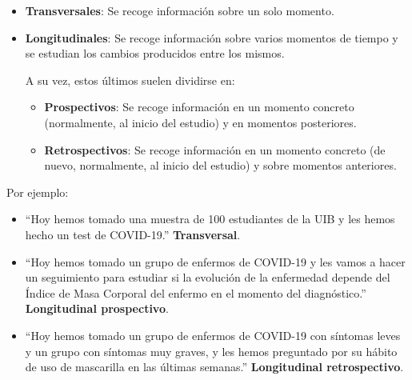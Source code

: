 \documentclass[
]{book}
\providecommand{\tightlist}{%
  \setlength{\itemsep}{0pt}\setlength{\parskip}{0pt}}
\theoremstyle{definition}
\theoremstyle{definition}
\theoremstyle{definition}
\theoremstyle{definition}
\theoremstyle{remark}
\begin{document}
\begin{itemize}
  \begin{itemize}
  \item
    \textbf{Transversales}: Se recoge información sobre un solo momento.
  \item
    \textbf{Longitudinales}: Se recoge información sobre varios momentos de tiempo y se estudian los cambios producidos entre los mismos.

    A su vez, estos últimos suelen dividirse en:

    \begin{itemize}
    \item
      \textbf{Prospectivos}: Se recoge información en un momento concreto (normalmente, al inicio del estudio) y en momentos posteriores.
    \item
      \textbf{Retrospectivos}: Se recoge información en un momento concreto (de nuevo, normalmente, al inicio del estudio) y sobre momentos anteriores.
    \end{itemize}
  \end{itemize}

  Por ejemplo:

  \begin{itemize}
  \tightlist
  \item
    ``Hoy hemos tomado una muestra de 100 estudiantes de la UIB y les hemos hecho un test de COVID-19.'' \textbf{Transversal}.
  \item
    ``Hoy hemos tomado un grupo de enfermos de COVID-19 y les vamos a hacer un seguimiento para estudiar si la evolución de la enfermedad depende del Índice de Masa Corporal del enfermo en el momento del diagnóstico.'' \textbf{Longitudinal prospectivo}.
  \item
    ``Hoy hemos tomado un grupo de enfermos de COVID-19 con síntomas leves y un grupo con síntomas muy graves, y les hemos preguntado por su hábito de uso de mascarilla en las últimas semanas.'' \textbf{Longitudinal retrospectivo}.
  \end{itemize}
\end{itemize}
\end{document}
